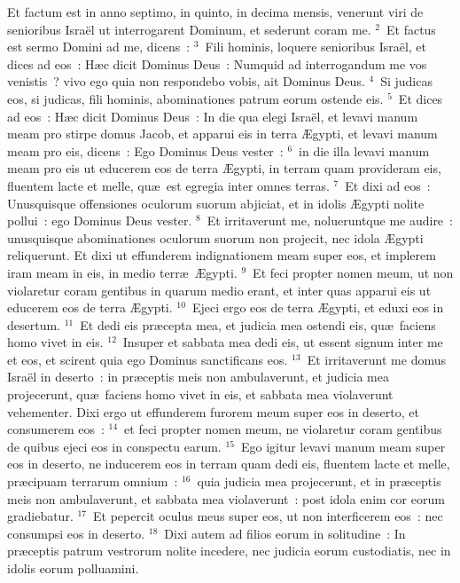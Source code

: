\bchapter
\lettrine[lines=3,image=true,loversize=0.05,lraise=-0.03]{E}{}t factum est in anno septimo, in quinto, in decima mensis, venerunt viri de senioribus Isra\"el ut interrogarent Dominum, et sederunt coram me.
${}^{2}$~Et factus est sermo Domini ad me, dicens~:
${}^{3}$~Fili hominis, loquere senioribus Isra\"el, et dices ad eos~: H\ae c dicit Dominus Deus~: Numquid ad interrogandum me vos venistis~? vivo ego quia non respondebo vobis, ait Dominus Deus.
${}^{4}$~Si judicas eos, si judicas, fili hominis, abominationes patrum eorum ostende eis.
${}^{5}$~Et dices ad eos~: H\ae c dicit Dominus Deus~: In die qua elegi Isra\"el, et levavi manum meam pro stirpe domus Jacob, et apparui eis in terra \AE gypti, et levavi manum meam pro eis, dicens~: Ego Dominus Deus vester~:
${}^{6}$~in die illa levavi manum meam pro eis ut educerem eos de terra \AE gypti, in terram quam provideram eis, fluentem lacte et melle, qu\ae\ est egregia inter omnes terras.
${}^{7}$~Et dixi ad eos~: Unusquisque offensiones oculorum suorum abjiciat, et in idolis \AE gypti nolite pollui~: ego Dominus Deus vester.
${}^{8}$~Et irritaverunt me, nolueruntque me audire~: unusquisque abominationes oculorum suorum non projecit, nec idola \AE gypti reliquerunt. Et dixi ut effunderem indignationem meam super eos, et implerem iram meam in eis, in medio terr\ae\ \AE gypti.
${}^{9}$~Et feci propter nomen meum, ut non violaretur coram gentibus in quarum medio erant, et inter quas apparui eis ut educerem eos de terra \AE gypti.
${}^{10}$~Ejeci ergo eos de terra \AE gypti, et eduxi eos in desertum.
${}^{11}$~Et dedi eis pr\ae cepta mea, et judicia mea ostendi eis, qu\ae\ faciens homo vivet in eis.
${}^{12}$~Insuper et sabbata mea dedi eis, ut essent signum inter me et eos, et scirent quia ego Dominus sanctificans eos.
${}^{13}$~Et irritaverunt me domus Isra\"el in deserto~: in pr\ae ceptis meis non ambulaverunt, et judicia mea projecerunt, qu\ae\ faciens homo vivet in eis, et sabbata mea violaverunt vehementer. Dixi ergo ut effunderem furorem meum super eos in deserto, et consumerem eos~:
${}^{14}$~et feci propter nomen meum, ne violaretur coram gentibus de quibus ejeci eos in conspectu earum.
${}^{15}$~Ego igitur levavi manum meam super eos in deserto, ne inducerem eos in terram quam dedi eis, fluentem lacte et melle, pr\ae cipuam terrarum omnium~:
${}^{16}$~quia judicia mea projecerunt, et in pr\ae ceptis meis non ambulaverunt, et sabbata mea violaverunt~: post idola enim cor eorum gradiebatur.
${}^{17}$~Et pepercit oculus meus super eos, ut non interficerem eos~: nec consumpsi eos in deserto.
${}^{18}$~Dixi autem ad filios eorum in solitudine~: In pr\ae ceptis patrum vestrorum nolite incedere, nec judicia eorum custodiatis, nec in idolis eorum polluamini.
